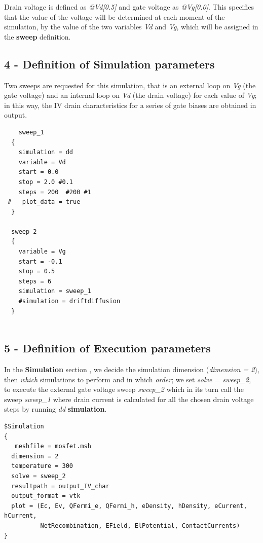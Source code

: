 Drain voltage is defined as \textit{@Vd[0.5]} and  gate voltage as \textit{@Vg[0.0]}. This specifies that the value of the voltage will be  determined at each moment of the simulation, by the value of the two variables \textit{Vd} and \textit{Vg}, which will be assigned in the \textbf{sweep}  definition. 

 
\subsection* {4 - Definition of Simulation parameters}

Two sweeps are requested for this simulation, that is an external loop on \textit{Vg} (the gate voltage) and an internal loop on \textit{Vd} (the drain voltage) for each value of \textit{Vg}; in this way, the IV drain characteristics for a series of gate biases are obtained in output.

\begin{verbatim}
    sweep_1
  {
    simulation = dd
    variable = Vd
    start = 0.0
    stop = 2.0 #0.1
    steps = 200  #200 #1
 #   plot_data = true
  }

  sweep_2
  {
    variable = Vg
    start = -0.1
    stop = 0.5
    steps = 6
    simulation = sweep_1
    #simulation = driftdiffusion
  }


\end{verbatim}


\subsection* {5 - Definition of Execution parameters}

In the \textbf{Simulation} section , we decide    the  simulation dimension  (\textit{dimension = 2}), then \textit{which} simulations to perform
 and in which \textit{order}; we set
\textit{solve = sweep\_2}, to execute the external  gate  voltage sweep \textit{sweep\_2} which in  its  turn  call the sweep \textit{sweep\_1}  where drain current is  calculated for all the  chosen  drain voltage  steps by running   \textit{dd} \textbf{simulation}.

\begin{verbatim}
$Simulation
{
   meshfile = mosfet.msh
  dimension = 2
  temperature = 300
  solve = sweep_2 
  resultpath = output_IV_char 
  output_format = vtk
  plot = (Ec, Ev, QFermi_e, QFermi_h, eDensity, hDensity, eCurrent, hCurrent, 
          NetRecombination, EField, ElPotential, ContactCurrents)
}

\end{verbatim}

